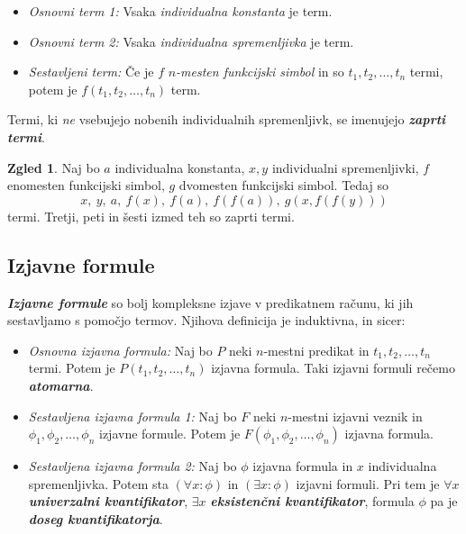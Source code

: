 \documentclass[11pt]{book}
\def\definicija{\color{rdeca}\bf\em}
\theoremstyle{definition}
\theoremstyle{zgled}
\newtheorem*{zgled}{Zgled}
\theoremstyle{odprtproblem}
\theoremstyle{domacanaloga}
\theoremstyle{izrek}
\begin{document}
\begin{itemize}
    \item \emph{Osnovni term 1:} Vsaka \emph{individualna konstanta} je term. 
    \item \emph{Osnovni term 2:} Vsaka \emph{individualna spremenljivka} je term.
    \item \emph{Sestavljeni term:} Če je $f$ \emph{$n$-mesten funkcijski simbol} in so $t_1, t_2, \dots, t_n$ termi, potem je $f(t_1,t_2,\dots,t_n)$ term.
\end{itemize}

Termi, ki \emph{ne} vsebujejo nobenih individualnih spremenljivk, se imenujejo {\definicija zaprti termi}.

\begin{zgled}
Naj bo $a$ individualna konstanta, $x,y$ individualni spremenljivki, $f$ enomesten funkcijski simbol, $g$ dvomesten funkcijski simbol. Tedaj so
\[
    x, \ y, \ a, \ f(x), \ f(a), \ f(f(a)), \ g(x,f(f(y)))
\]
termi. Tretji, peti in šesti izmed teh so zaprti termi.
\end{zgled}

\subsection{Izjavne formule}

{\definicija Izjavne formule} so bolj kompleksne izjave v predikatnem računu, ki jih sestavljamo s pomočjo termov. Njihova definicija je induktivna, in sicer:

\begin{itemize}
    \item \emph{Osnovna izjavna formula:} Naj bo $P$ neki $n$-mestni predikat in $t_1, t_2, \dots, t_n$ termi. Potem je $P(t_1, t_2, \dots, t_n)$ izjavna formula. Taki izjavni formuli rečemo {\definicija atomarna}.  
    \item \emph{Sestavljena izjavna formula 1:} Naj bo $F$ neki $n$-mestni izjavni veznik in $\phi_1, \phi_2, \dots, \phi_n$ izjavne formule. Potem je $F(\phi_1, \phi_2, \dots, \phi_n)$ izjavna formula.
    \item \emph{Sestavljena izjavna formula 2:} Naj bo $\phi$ izjavna formula in $x$ individualna spremenljivka. Potem sta $(\forall x \colon \phi)$ in $(\exists x \colon \phi)$ izjavni formuli. Pri tem je $\forall x$ {\definicija univerzalni kvantifikator}, $\exists x$ {\definicija eksistenčni kvantifikator}, formula $\phi$ pa je {\definicija doseg kvantifikatorja}.
\end{itemize}
\end{document}
